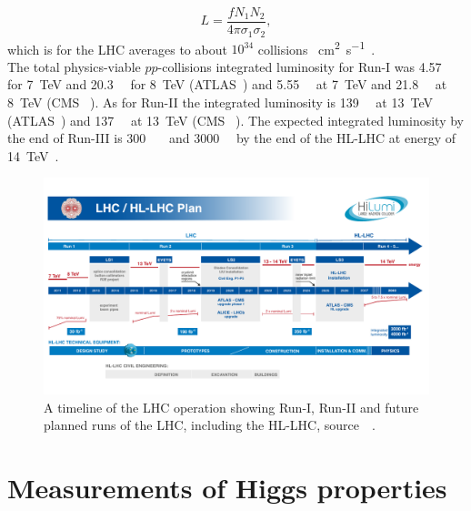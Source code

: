 \begin{equation}
	L = \frac{f N_1 N_2}{4 \pi  \sigma_1 \sigma_2},
\end{equation}
which is for the LHC averages to about $ 10^{34}$ collisions \si{\per \centi\metre\squared \per \second}~\cite{closer,lhcpreformance}.  \\ The total physics-viable $pp$-collisions  integrated luminosity for Run-I was \SI{4.57}{\per \femtobarn} for \SI{7}{\tera\electronvolt} and \SI{20.3}{\per \femtobarn} for \SI{8}{\tera\electronvolt} (ATLAS~\cite{atlaslumi1}) and  \SI{5.55}{\per \femtobarn} at \SI{7}{\tera\electronvolt} and \SI{21.8}{\per \femtobarn} at \SI{8}{\tera\electronvolt} (CMS ~\cite{cmslumi}). As for Run-II the integrated luminosity is \SI{139}{\per \femtobarn} at \SI{13}{\tera\electronvolt } (ATLAS~\cite{atlaslumi2})  and \SI{137}{\per \femtobarn} at \SI{13}{\tera\electronvolt } (CMS ~\cite{cmslumi}). The expected integrated luminosity by the end of Run-III is  \SI{300}{\per \femtobarn}~\cite{Fartoukh:2790409} and \SI{3000}{\per \femtobarn} by the end of the HL-LHC at energy of \SI{14}{\tera\electronvolt }~\cite{Apollinari:2015bam}. 
\begin{figure}
	\centering
		\includegraphics[width=\textwidth]{figures/HL-LHC-plan-2021-1}
	\caption{ A timeline of the LHC operation showing Run-I, Run-II and future planned runs of the LHC, including the HL-LHC, source~~\cite{lhckomission}. 
	}
\label{fig:lhcplan}
\end{figure}
\FloatBarrier
\section{Measurements of Higgs properties \label{sec:Higgsprop} }


